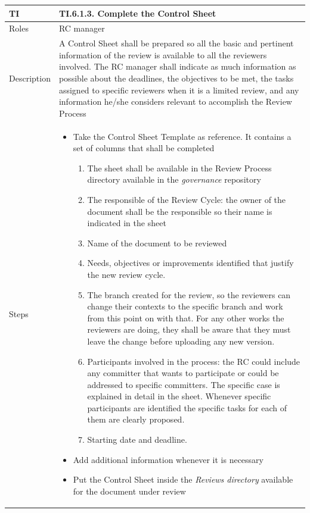 \documentclass{template/openetcs_article}
\begin{document}
\begin{flushleft}
\tablefirsthead{}
\tablehead{}
\tabletail{}
\tablelasttail{}
\begin{supertabular}{|m{2cm}|m{13cm}|}
\hline
{}
TI & 
TI.6.1.3. Complete the Control Sheet
\\\hline
Roles &
RC manager
\\\hline
Description &
A Control Sheet shall be prepared so all the basic and pertinent information of the review is available to all the reviewers involved. The RC manager shall indicate as much information as possible about the deadlines, the objectives to be met, the tasks assigned to specific reviewers when it is a limited review, and any information he/she considers relevant to accomplish the Review Process
\\\hline
Steps &
\begin{itemize}
\item Take the Control Sheet Template as reference. It contains a set of columns that shall be completed
\begin{enumerate}
\item The sheet shall be available in the Review Process directory available in the {\it governance} repository
\item The responsible of the Review Cycle: the owner of the document shall be the responsible so their name is indicated in the sheet
\item Name of the document to be reviewed
\item Needs, objectives or improvements identified that justify the new review cycle.
\item The branch created for the review, so the reviewers can change their contexts to the specific branch and work from this point on with that. For any other works the reviewers are doing, they shall be aware that they must leave the change before uploading any new version.
\item Participants involved in the process: the RC could include any committer that wants to participate or could be addressed to specific committers. The specific case is explained in detail in the sheet. Whenever specific participants are identified the specific tasks for each of them are clearly proposed.
\item Starting date and deadline.
\end{enumerate}
\item Add additional information whenever it is necessary
\item Put the Control Sheet inside the {\it Reviews directory} available for the document under review
\end{itemize}
\\\hline
\end{supertabular}
\end{flushleft}
\end{document}
